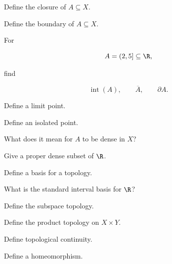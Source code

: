 \begin{exercise}[1]
Define the closure of \(A\subseteq X\).
\end{exercise}

\begin{exercise}[1]
Define the boundary of \(A\subseteq X\).
\end{exercise}

\begin{exercise}[1]
For

\[
A=(2,5]
\subseteq\R,
\]

find

\[
\operatorname{int}(A),
\qquad
\overline{A},
\qquad
\partial A.
\]
\end{exercise}

\begin{exercise}[1]
Define a limit point.
\end{exercise}

\begin{exercise}[1]
Define an isolated point.
\end{exercise}

\begin{exercise}[1]
What does it mean for \(A\) to be dense in \(X\)?
\end{exercise}

\begin{exercise}[1]
Give a proper dense subset of \(\R\).
\end{exercise}

\begin{exercise}[1]
Define a basis for a topology.
\end{exercise}

\begin{exercise}[1]
What is the standard interval basis for \(\R\)?
\end{exercise}

\begin{exercise}[1]
Define the subspace topology.
\end{exercise}

\begin{exercise}[1]
Define the product topology on \(X\times Y\).
\end{exercise}

\begin{exercise}[1]
Define topological continuity.
\end{exercise}

\begin{exercise}[1]
Define a homeomorphism.
\end{exercise}

